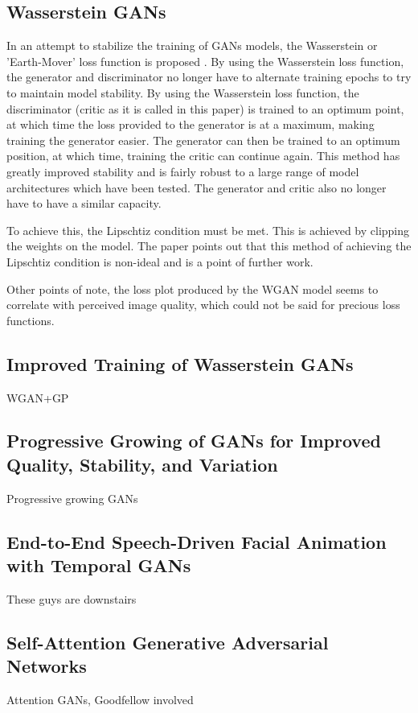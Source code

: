 \documentclass[12pt]{article}
\begin{document}
\subsection{Wasserstein GANs}
In an attempt to stabilize the training of GANs models, the Wasserstein or 'Earth-Mover' loss function is proposed \cite{Arjovsky2017}.
By using the Wasserstein loss function, the generator and discriminator no longer have to alternate training epochs to try to maintain model stability.
By using the Wasserstein loss function, the discriminator (critic as it is called in this paper) is trained to an optimum point, at which time the loss provided to the generator is at a maximum, making training the generator easier.
The generator can then be trained to an optimum position, at which time, training the critic can continue again.
This method has greatly improved stability and is fairly robust to a large range of model architectures which have been tested.
The generator and critic also no longer have to have a similar capacity.

To achieve this, the Lipschtiz condition must be met.
This is achieved by clipping the weights on the model.
The paper points out that this method of achieving the Lipschtiz condition is non-ideal and is a point of further work.

Other points of note, the loss plot produced by the WGAN model seems to correlate with perceived image quality, which could not be said for precious loss functions.

\subsection{Improved Training of Wasserstein GANs}
WGAN+GP \cite{Gulrajani2017}

\subsection{Progressive Growing of GANs for Improved Quality, Stability, and Variation}
Progressive growing GANs \cite{Karras2017b}

\subsection{End-to-End Speech-Driven Facial Animation with Temporal GANs}
These guys are downstairs \cite{Vougioukas2018}

\subsection{Self-Attention Generative Adversarial Networks}
Attention GANs, Goodfellow involved \cite{Zhang2018}
\end{document}
